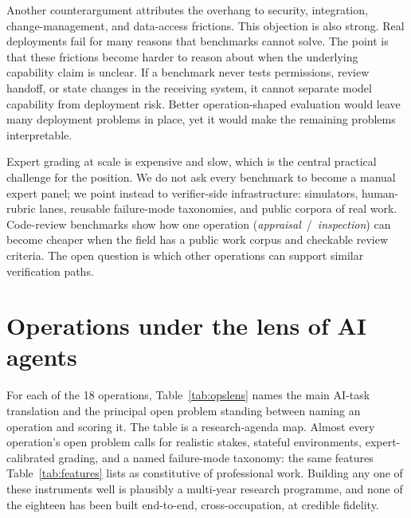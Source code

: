 \documentclass{article}
\begin{document}
Another counterargument attributes the overhang to security, integration, change-management, and data-access frictions.
This objection is also strong.
Real deployments fail for many reasons that benchmarks cannot solve.
The point is that these frictions become harder to reason about when the underlying capability claim is unclear.
If a benchmark never tests permissions, review handoff, or state changes in the receiving system, it cannot separate model capability from deployment risk.
Better operation-shaped evaluation would leave many deployment problems in place, yet it would make the remaining problems interpretable.

Expert grading at scale is expensive and slow, which is the central practical challenge for the position.
We do not ask every benchmark to become a manual expert panel; we point instead to verifier-side infrastructure: simulators, human-rubric lanes, reusable failure-mode taxonomies, and public corpora of real work.
Code-review benchmarks \citep{sweprbench2025,codefusecrbench2025,withmartiancr2024} show how one operation (\emph{appraisal}~/~\emph{inspection}) can become cheaper when the field has a public work corpus and checkable review criteria.
The open question is which other operations can support similar verification paths.

\section{Operations under the lens of AI agents}
\label{app:opslens}

For each of the 18 operations, Table~\ref{tab:opslens} names the main AI-task translation and the principal open problem standing between naming an operation and scoring it.
The table is a research-agenda map.
Almost every operation's open problem calls for realistic stakes, stateful environments, expert-calibrated grading, and a named failure-mode taxonomy: the same features Table~\ref{tab:features} lists as constitutive of professional work.
Building any one of these instruments well is plausibly a multi-year research programme, and none of the eighteen has been built end-to-end, cross-occupation, at credible fidelity.
\end{document}
